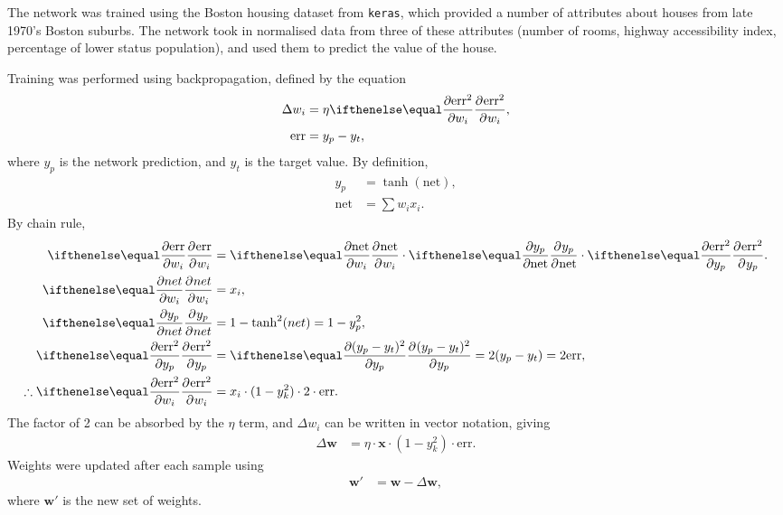 The network was trained using the Boston housing dataset from \texttt{keras},
which provided a number of attributes about houses from late 1970's Boston
suburbs.
The network took in normalised data from three of these attributes (number of
rooms, highway accessibility index, percentage of lower status population), and
used them to predict the value of the house.

Training was performed using backpropagation, defined by the equation
\begin{align*}
    \Delta w_i &= \eta\Rpdiff{\text{err}^2}{w_i},\\
    \text{err} &= y_p - y_t,
\end{align*}
where $y_p$ is the network prediction, and $y_t$ is the target value.
By definition,
\begin{align*}
    y_p &= \tanh(\text{net}),\\
    \text{net} &= \sum w_ix_i.
\end{align*}
By chain rule,
\begin{align*}
    \Rpdiff{\text{err}}{w_i} &=
    \Rpdiff{\text{net}}{w_i} \cdot
    \Rpdiff{y_p}{\text{net}} \cdot
    \Rpdiff{\text{err}^2}{y_p}.\\
    \Rpdiff{net}{w_i} &= x_i,\\
    \Rpdiff{y_p}{net} &= 1 - \tanh^2(net) = 1 - y_p^2,\\
    \Rpdiff{\text{err}^2}{y_p} &= \Rpdiff{(y_p - y_t)^2}{y_p}
    = 2(y_p - y_t) = 2\text{err},\\
    \therefore\Rpdiff{\text{err}^2}{w_i} &=
    x_i \cdot (1 - y_k^2) \cdot 2\cdot\text{err}.
\end{align*}
The factor of 2 can be absorbed by the $\eta$ term, and $\Delta w_i$ can be
written in vector notation, giving
\begin{align*}
    \Delta \mathbf{w} &= \eta\cdot\mathbf{x}\cdot (1-y_k^2)\cdot \text{err}.
\end{align*}
Weights were updated after each sample using
\begin{align*}
    \mathbf{w}' &= \mathbf{w} - \Delta\mathbf{w},
\end{align*}
where $\mathbf{w}'$ is the new set of weights.

